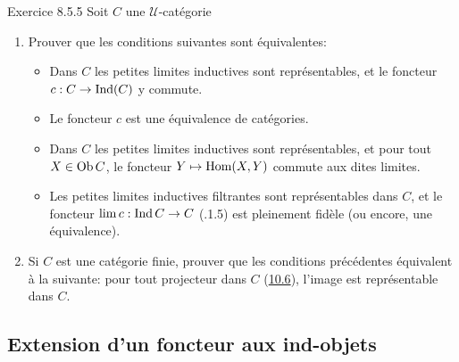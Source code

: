 \documentclass[10pt]{../fichiers-configuration-latex/smfart}
\def\labelenumi{(\theenumi)}
\begin{document}
\begin{enonce*}[remark]{Exercice 8.5.5}
Soit $C$ une $𝒰$-catégorie
\begin{enumerate}
\renewcommand{\theenumi}{\alph{enumi}}
\renewcommand{\labelenumi}{\theenumi)}
\item Prouver que les conditions suivantes sont équivalentes:

\begin{itemize}
\item[(i)] Dans $C$ les petites limites inductives sont représentables,
et le foncteur $c:C\rightarrow \operatorname{Ind}(C)$ y commute.

\item[(iii)] Le foncteur $c$ est une équivalence de catégories.

\item[(ii)] Dans $C$ les petites limites inductives sont
représentables, et pour tout $X\in \operatorname{Ob} C$, le foncteur $Y\mapsto
\operatorname{Hom}(X,Y)$ commute aux dites limites.

\item[(iv)] Les petites limites inductives filtrantes sont
représentables dans $C$, et le foncteur $\lim c:\operatorname{Ind} C\rightarrow C$
(.1.5) est pleinement fidèle (ou encore, une
équivalence).
\end{itemize}

\item Si $C$ est une catégorie finie, prouver que les conditions
précédentes équivalent à la suivante: pour tout
projecteur dans $C$
(\hyperref[I.sec10.6]{10.6}), l'image est représentable dans $C$.
\end{enumerate}
\end{enonce*}

\subsection{Extension d'un foncteur aux
  ind-objets}
\end{document}
